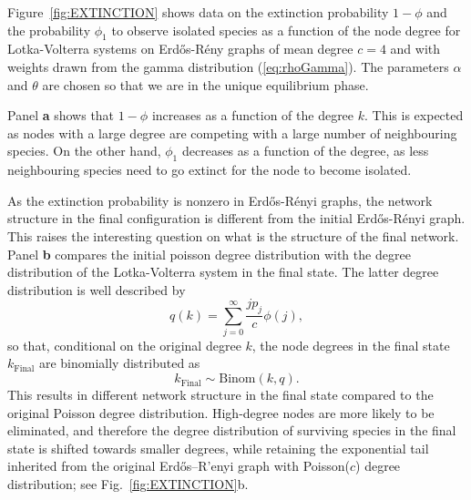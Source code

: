 \documentclass[11pt,a4paper]{article}
\begin{document}
Figure~\ref{fig:EXTINCTION}   shows data on the extinction probability $1-\phi$ and the probability $\phi_1$ to observe isolated species as a function of the node degree for Lotka-Volterra systems on Erd\H{o}s-R\'{e}ny graphs of mean degree $c=4$  and with  weights drawn from the gamma distribution (\ref{eq:rhoGamma}).   The parameters $\alpha$ and $\theta$ are chosen so that we are in the unique equilibrium phase.   

Panel {\bf a} shows that  $1-\phi$ increases as a function of the degree $k$.  This is expected as nodes with  a large degree are competing with a large number of neighbouring species.  On the other hand, $\phi_1$ decreases as a function of the degree, as less neighbouring species need to go extinct for the node to become isolated.  

As the extinction probability is nonzero in Erd\H{o}s-R\'{e}nyi graphs, the network structure in the final configuration is different from the initial  Erd\H{o}s-R\'{e}nyi graph.   This raises the interesting question on what is the structure of the final network.   Panel {\bf b} compares the initial poisson degree distribution with the degree distribution of the Lotka-Volterra system in the final state.  The latter degree distribution is well described by 
\begin{equation}
    q(k) = \sum^{\infty}_{j=0} \frac{j p_j}{c}\phi(j),
\end{equation}
so that, conditional on the original degree $k$, the node degrees in the final state $k_{\text{Final}}$ are binomially distributed as
\begin{equation}
    k_{\text{Final}} \sim \mathrm{Binom}(k,q).
\end{equation}
This results in different network structure in the final state compared to the original Poisson degree distribution. High-degree nodes are more likely to be eliminated, and therefore the degree distribution of surviving species in the final state is shifted towards smaller degrees, while retaining the exponential tail inherited from the original Erd\H{o}s--R'enyi graph with Poisson($c$) degree distribution; see Fig.~\ref{fig:EXTINCTION}b.
\end{document}
